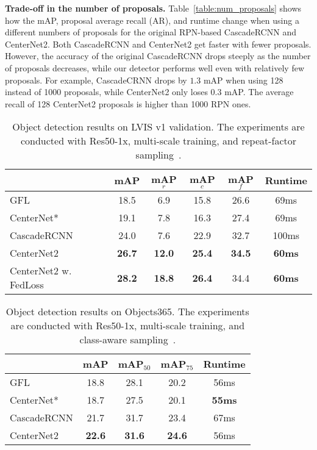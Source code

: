 \documentclass{article}
\renewcommand{\paragraph}[1]{\noindent\textbf{#1}}
\newcommand{\name}{CenterNet2 }
\begin{document}
\paragraph{Trade-off in the number of proposals.}
Table~\ref{table:num_proposals} shows how the mAP, proposal average recall (AR), and runtime change when using a different numbers of proposals for the original RPN-based CascadeRCNN and CenterNet2.
Both CascadeRCNN and CenterNet2 get faster with fewer proposals.
However, the accuracy of the original CascadeRCNN drops steeply as the number of proposals decreases, while our detector performs well even with relatively few proposals.
For example, CascadeCRNN drops by $1.3$ mAP when using 128 instead of 1000 proposals, while CenterNet2 only loses $0.3$ mAP.
The average recall of 128 CenterNet2 proposals is higher than 1000 RPN ones.


\begin{table}[!t]
\centering
\begin{tabular}{@{}l@{}c@{\ }c@{\ }c@{\ }c@{\ }c@{}}
\toprule
& mAP & mAP$_{r}$ & mAP$_{c}$ & mAP$_{f}$ & Runtime \\
\midrule
GFL{~\cite{li2020generalized}} & 18.5 & 6.9 & 15.8 & 26.6 & 69ms \\
CenterNet* & 19.1 & 7.8 & 16.3 & 27.4 & 69ms \\
CascadeRCNN & 24.0  & 7.6 & 22.9  & 32.7 & 100ms\\
\name & \bf 26.7  & \bf 12.0  & \bf 25.4 & \bf 34.5 & \textbf{60ms}\\
\midrule
\name w. FedLoss & \bf 28.2  & \bf 18.8  & \bf 26.4 & 34.4 & \textbf{60ms}\\
\bottomrule
\end{tabular}
\normalsize
\vspace{-2mm}
\caption{Object detection results on LVIS v1 validation. The experiments are conducted with Res50-1x, multi-scale training, and repeat-factor sampling~\cite{gupta2019lvis}. 
}
\vspace{-5mm}
\label{table:lvis}
\end{table}


\begin{table}[!t]
\centering
\begin{tabular}{@{}l@{\ \ }c@{\ \ }c@{\ \ }c@{\ \ }c@{}}
\toprule
& mAP & mAP$_{50}$ & mAP$_{75}$ & Runtime \\
\midrule
GFL~\cite{li2020generalized} & 18.8 & 28.1 & 20.2 & 56ms \\
CenterNet* & 18.7 & 27.5 & 20.1 & \textbf{55ms} \\
CascadeRCNN & 21.7  & 31.7 & 23.4 & 67ms \\
\name & \textbf{22.6} & \textbf{31.6}  & \textbf{24.6} & 56ms \\
\bottomrule
\end{tabular}
\normalsize
\vspace{-2mm}
\caption{Object detection results on Objects365. The experiments are conducted with Res50-1x, multi-scale training, and class-aware sampling~\cite{shen2016relay}. 
}
\vspace{-6mm}
\label{table:objects365}
\end{table}
\end{document}
